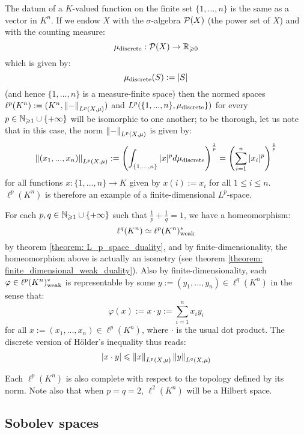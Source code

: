         \begin{example}
            The datum of a $K$-valued function on the finite set $\{1, ..., n\}$ is the same as a vector in $K^n$. If we endow $X$ with the $\sigma$-algebra $\mathcal{P}(X)$ (the power set of $X$) and with the counting measure:
                $$\mu_{\mathrm{discrete}}: \mathcal{P}(X) \to \mathbb{R}_{\geqslant 0}$$
            which is given by:
                $$\mu_{\mathrm{discrete}}(S) := |S|$$
            (and hence $\{1, ..., n\}$ is a measure-finite space) then the normed spaces $\ell^p(K^n) := (K^n, \left\| {-} \right\|_{L^p(X, \mu)})$ and $L^p(\{1, ..., n\}, \mu_{\mathrm{discrete}}\})$ for every $p \in \mathbb{N}_{\geqslant 1} \cup \{+\infty\}$ will be isomorphic to one another; to be thorough, let us note that in this case, the norm $\left\| {-} \right\|_{L^p(X, \mu)}$ is given by:
                $$\left\| {(x_1, ..., x_n)} \right\|_{L^p(X, \mu)} := \left( \int_{\{1, ..., n\}} |x|^p d\mu_{\mathrm{discrete}} \right)^{\frac1p} = \left( \sum_{i = 1}^n |x_i|^p \right)^{\frac1p}$$
            for all functions $x: \{1, ..., n\} \to K$ given by $x(i) := x_i$ for all $1 \leq i \leq n$. $\ell^p(K^n)$ is therefore an example of a finite-dimensional $L^p$-space.

            For each $p, q \in \mathbb{N}_{\geqslant 1} \cup \{+\infty\}$ such that $\frac1p + \frac1q = 1$, we have a homeomorphism:
                $$\ell^q(K^n) \simeq \ell^p(K^n)^*_{\mathrm{weak}}$$
            by theorem \ref{theorem: L_p_space_duality}, and by finite-dimensionality, the homeomorphism above is actually an isometry (see theorem \ref{theorem: finite_dimensional_weak_duality}). Also by finite-dimensionality, each $\varphi \in \ell^p(K^n)^*_{\mathrm{weak}}$ is representable by some $y := (y_1, ..., y_n) \in \ell^q(K^n)$ in the sense that:
                $$\varphi(x) := x \cdot y := \sum_{i = 1}^n x_i y_i$$
            for all $x := (x_1, ..., x_n) \in \ell^p(K^n)$, where $\cdot$ is the usual dot product. The discrete version of H\"older's inequality thus reads:
                $$\left\lvert {x \cdot y} \right\rvert \leqslant \left\| {x} \right\|_{L^p(X, \mu)} \left\| {y} \right\|_{L^q(X, \mu)}$$

            Each $\ell^p(K^n)$ is also complete with respect to the topology defined by its norm. Note also that when $p = q = 2$, $\ell^2(K^n)$ will be a Hilbert space.
        \end{example}

    \subsection{Sobolev spaces}